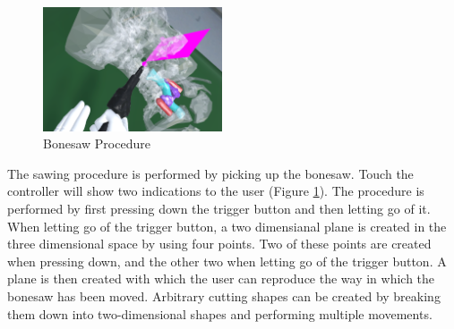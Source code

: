 \begin{figure}[ht]
    \centering
    \includegraphics[width=200px]{images/implementation/features/procedures/bonesaw.png}
    \caption{\label{fig::FeatureBoneSaw} Bonesaw Procedure}
\end{figure}

The sawing procedure is performed by picking up the bonesaw.
Touch the controller will show two indications to the user (Figure \ref{fig::FeatureBoneSaw}).
The procedure is performed by first pressing down the trigger button and then letting go of it.
When letting go of the trigger button, a two dimensianal plane is created in the three dimensional space by using four points.
Two of these points are created when pressing down, and the other two when letting go of the trigger button.
A plane is then created with which the user can reproduce the way in which the bonesaw has been moved.
Arbitrary cutting shapes can be created by breaking them down into two-dimensional shapes and performing multiple movements.